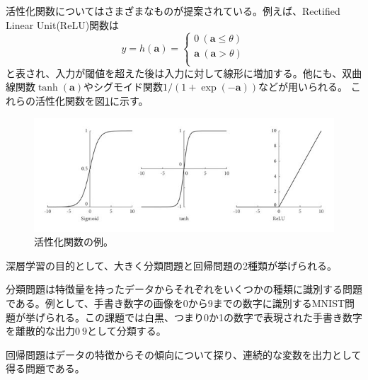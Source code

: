 活性化関数についてはさまざまなものが提案されている。例えば、Rectified Linear Unit(ReLU)関数は
\begin{equation}
y = h(\textbf{a}) = \left\{
\begin{aligned}
0  \ (\textbf{a}  \le \theta)\\
\textbf{a}  \ (\textbf{a}  > \theta)\\
\end{aligned}
\right.
\end{equation}
と表され、入力が閾値を超えた後は入力に対して線形に増加する。他にも、双曲線関数$\tanh(\textbf{a})$やシグモイド関数$1/(1+\exp(-\textbf{a}))$などが用いられる。
これらの活性化関数を図\ref{act}に示す。

\begin{figure}[H]
	\begin{center}
		\includegraphics[width=350pt]{./Figure/DeepLearning/Output.jpeg}
		\caption[活性化関数の例。]{活性化関数の例。}
		\label{act}
	\end{center}
\end{figure}

深層学習の目的として、大きく分類問題と回帰問題の2種類が挙げられる。

分類問題は特徴量を持ったデータからそれぞれをいくつかの種類に識別する問題である。例として、手書き数字の画像を0から9までの数字に識別するMNIST問題が挙げられる。この課題では白黒、つまり0か1の数字で表現された手書き数字を離散的な出力$0~9$として分類する。

回帰問題はデータの特徴からその傾向について探り、連続的な変数を出力として得る問題である。


